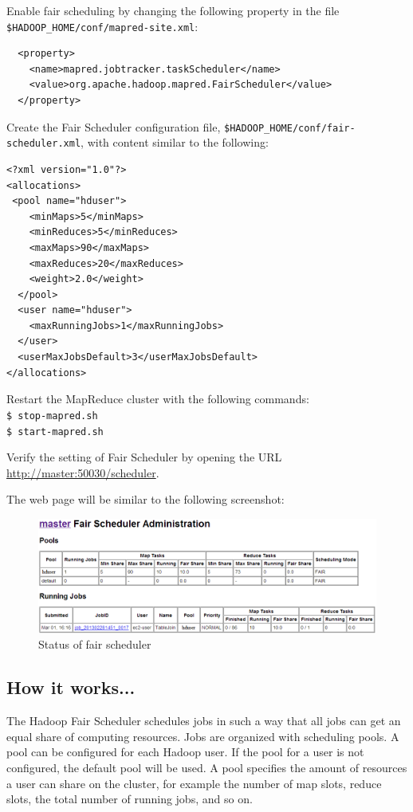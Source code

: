 Enable fair scheduling by changing the following property in the file \verb|$HADOOP_HOME/conf/mapred-site.xml|:
\begin{verbatim}
  <property>
    <name>mapred.jobtracker.taskScheduler</name>
    <value>org.apache.hadoop.mapred.FairScheduler</value>
  </property>
\end{verbatim}

Create the Fair Scheduler configuration file, \verb|$HADOOP_HOME/conf/fair-scheduler.xml|, with content similar to the following: 
\begin{verbatim}
<?xml version="1.0"?> 
<allocations>
 <pool name="hduser">
    <minMaps>5</minMaps>
    <minReduces>5</minReduces>
    <maxMaps>90</maxMaps>
    <maxReduces>20</maxReduces>
    <weight>2.0</weight>
  </pool>
  <user name="hduser">
    <maxRunningJobs>1</maxRunningJobs>
  </user>
  <userMaxJobsDefault>3</userMaxJobsDefault>
</allocations>
\end{verbatim}

Restart the MapReduce cluster with the following commands: \\
\verb|$ stop-mapred.sh| \\
\verb|$ start-mapred.sh|

Verify the setting of Fair Scheduler by opening the URL \url{http://master:50030/scheduler}.

The web page will be similar to the following screenshot:
\begin{figure}[h]
  \centering
  \includegraphics[width=\textwidth]{figs/5163os_04_16.png}
  \caption{Status of fair scheduler}\label{fig:fairscheduler}
\end{figure} 

\subsection*{How it works...}
The Hadoop Fair Scheduler schedules jobs in such a way that all jobs can get an equal share of computing resources. Jobs are organized with scheduling pools. A pool can be configured for each Hadoop user. If the pool for a user is not configured, the default pool will be used. A pool specifies the amount of resources a user can share on the cluster, for example the number of map slots, reduce slots, the total number of running jobs, and so on.

